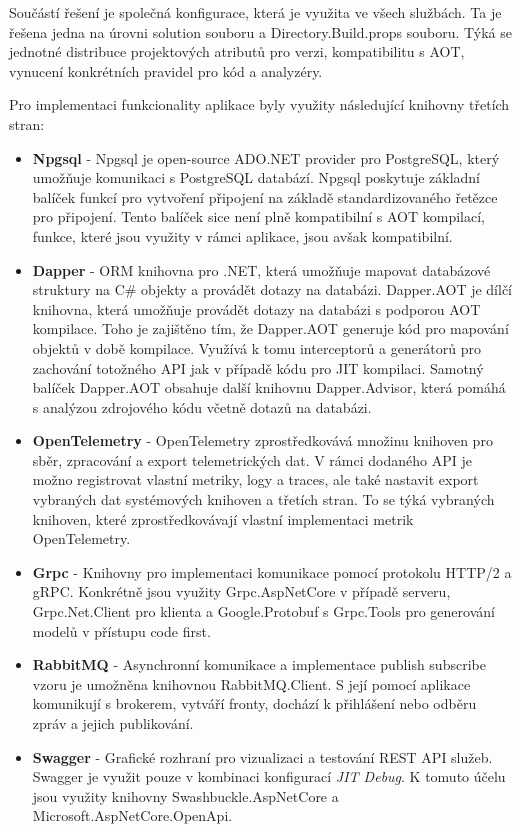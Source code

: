 Součástí řešení je společná konfigurace, která je využita ve všech službách. Ta je řešena jedna na úrovni solution souboru a Directory.Build.props souboru. Týká se jednotné distribuce projektových atributů pro verzi, kompatibilitu s AOT, vynucení konkrétních pravidel pro kód a analyzéry.


Pro implementaci funkcionality aplikace byly využity následující knihovny třetích stran:

\begin{itemize}
  \item \textbf{Npgsql} - Npgsql je open-source ADO.NET provider pro PostgreSQL, který umožňuje komunikaci s PostgreSQL databází. Npgsql poskytuje základní balíček funkcí pro vytvoření připojení na základě standardizovaného řetězce pro připojení. Tento balíček sice není plně kompatibilní s AOT kompilací, funkce, které jsou využity v rámci aplikace, jsou avšak kompatibilní.
  \item \textbf{Dapper} - ORM knihovna pro .NET, která umožňuje mapovat databázové struktury na C\# objekty a provádět dotazy na databázi. Dapper.AOT je dílčí knihovna, která umožňuje provádět dotazy na databázi s podporou AOT kompilace. Toho je zajištěno tím, že Dapper.AOT generuje kód pro mapování objektů v době kompilace. Využívá k tomu interceptorů a generátorů pro zachování totožného API jak v případě kódu pro JIT kompilaci. Samotný balíček Dapper.AOT obsahuje další knihovnu Dapper.Advisor, která pomáhá s analýzou zdrojového kódu včetně dotazů na databázi.
  \item \textbf{OpenTelemetry} - OpenTelemetry zprostředkovává množinu knihoven pro sběr, zpracování a export telemetrických dat. V rámci dodaného API je možno registrovat vlastní metriky, logy a traces, ale také nastavit export vybraných dat systémových knihoven a třetích stran. To se týká vybraných knihoven, které zprostředkovávají vlastní implementaci metrik OpenTelemetry.
  \item \textbf{Grpc} - Knihovny pro implementaci komunikace pomocí protokolu HTTP/2 a gRPC. Konkrétně jsou využity Grpc.AspNetCore v případě serveru, Grpc.Net.Client pro klienta a Google.Protobuf s Grpc.Tools pro generování modelů v přístupu code first.
  \item \textbf{RabbitMQ} - Asynchronní komunikace a implementace publish subscribe vzoru je umožněna knihovnou RabbitMQ.Client. S její pomocí aplikace komunikují s brokerem, vytváří fronty, dochází k přihlášení nebo odběru zpráv a jejich publikování.
  \item \textbf{Swagger} - Grafické rozhraní pro vizualizaci a testování REST API služeb. Swagger je využit pouze v kombinaci konfigurací \emph{JIT Debug}. K tomuto účelu jsou využity knihovny Swashbuckle.AspNetCore a Microsoft.AspNetCore.OpenApi.
\end{itemize}

